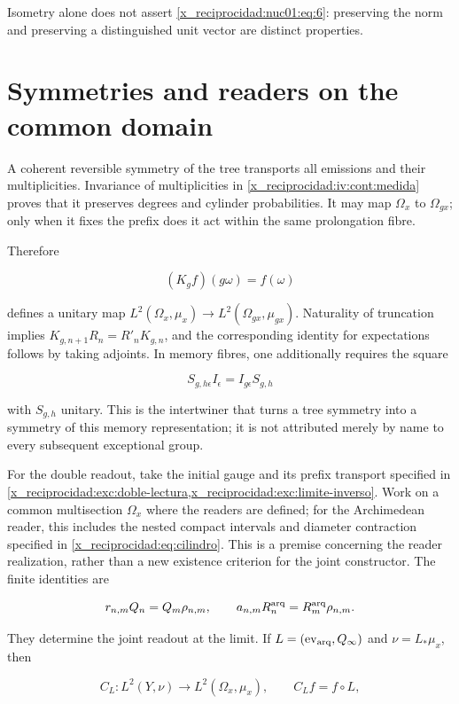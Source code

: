 Isometry alone does not assert \eqref{x_reciprocidad:nuc01:eq:6}: preserving the norm and preserving a distinguished unit vector are distinct properties.

\section{Symmetries and readers on the common domain}

A coherent reversible symmetry of the tree transports all emissions and their multiplicities. Invariance of multiplicities in \cref{x_reciprocidad:iv:cont:medida} proves that it preserves degrees and cylinder probabilities. It may map \(\Omega_x\) to \(\Omega_{gx}\); only when it fixes the prefix does it act within the same prolongation fibre.

Therefore

\[
(K_gf)(g\omega)=f(\omega)
\]

defines a unitary map \(L^2(\Omega_x,\mu_x)\to L^2(\Omega_{gx},\mu_{gx})\). Naturality of truncation implies \(K_{g,n+1}R_n=R'_nK_{g,n}\), and the corresponding identity for expectations follows by taking adjoints. In memory fibres, one additionally requires the square

\[
S_{g,h\epsilon}I_\epsilon=I_{g\epsilon}S_{g,h}
\]

with \(S_{g,h}\) unitary. This is the intertwiner that turns a tree symmetry into a symmetry of this memory representation; it is not attributed merely by name to every subsequent exceptional group.

For the double readout, take the initial gauge and its prefix transport specified in \cref{x_reciprocidad:exc:doble-lectura,x_reciprocidad:exc:limite-inverso}. Work on a common multisection \(\Omega_x\) where the readers are defined; for the Archimedean reader, this includes the nested compact intervals and diameter contraction specified in \eqref{x_reciprocidad:eq:cilindro}. This is a premise concerning the reader realization, rather than a new existence criterion for the joint constructor. The finite identities are

\begin{equation}
r_{n,m}Q_n=Q_m\rho_{n,m},\qquad
a_{n,m}R^{\rm arq}_n=R^{\rm arq}_m\rho_{n,m}.
\label{x_reciprocidad:nuc01:eq:7}
\end{equation}

They determine the joint readout at the limit. If \(L=(\operatorname{ev}_{\rm arq},Q_\infty)\) and \(\nu=L_*\mu_x\), then

\[
C_L:L^2(Y,\nu)\longrightarrow L^2(\Omega_x,\mu_x),
\qquad C_Lf=f\circ L,
\]

